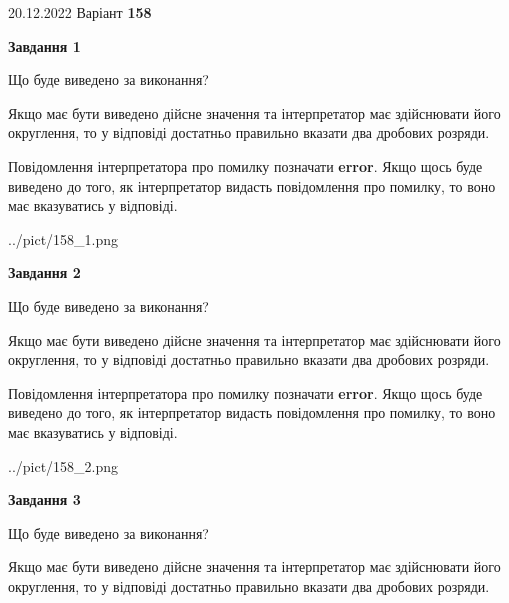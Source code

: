 \documentclass[12pt, ukrainian]{article}
\begin{document}
{20.12.2022 Варіант \No \textbf { 158 }\par}
{
\begin {Large}

{\begin {center}\textbf{Завдання 1}\end {center}}\par
Що буде виведено за виконання? \par

Якщо має бути виведено дійсне значення та інтерпретатор має здійснювати його округлення, 
то у відповіді достатньо правильно вказати два дробових розряди.

Повідомлення інтерпретатора про помилку позначати \textbf{error}.
Якщо щось буде виведено до того, як інтерпретатор видасть повідомлення про помилку, 
то воно має вказуватись у відповіді. \par

\begin{center}
	{../pict/158_1.png}
\end{center}
\newpage

{\begin {center}\textbf{Завдання 2}\end {center}}\par
Що буде виведено за виконання? \par

Якщо має бути виведено дійсне значення та інтерпретатор має здійснювати його округлення, 
то у відповіді достатньо правильно вказати два дробових розряди.

Повідомлення інтерпретатора про помилку позначати \textbf{error}.
Якщо щось буде виведено до того, як інтерпретатор видасть повідомлення про помилку, 
то воно має вказуватись у відповіді. \par

\begin{center}
	{../pict/158_2.png}
\end{center}
\newpage

{\begin {center}\textbf{Завдання 3}\end {center}}\par
Що буде виведено за виконання? \par

Якщо має бути виведено дійсне значення та інтерпретатор має здійснювати його округлення, 
то у відповіді достатньо правильно вказати два дробових розряди.


\end{Large}}
\end{document}
